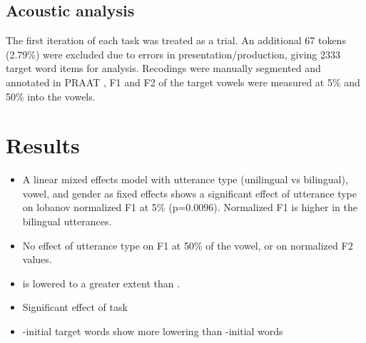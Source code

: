 \documentclass[11pt]{article}
\newcommand{\nt}[1]{\textipa{[#1]}} %
\newcommand{\wt}[1]{\textipa{/#1/}} %
\begin{document}
\subsection{Acoustic analysis}
The first iteration of each task was treated as a trial. An additional 67 tokens (2.79\%) were excluded due to errors in presentation/production, giving 2333 target word items for analysis. Recodings were manually segmented and annotated in PRAAT \cite{boersma2016praat}, F1 and F2 of the target vowels \nt{2, ae} were measured at 5\% and 50\% into the vowels. 


\section{Results} %
\begin{itemize}
	\item A linear mixed effects model with utterance type (unilingual vs bilingual), vowel, and gender as fixed effects shows a significant effect of utterance type on lobanov normalized F1 at 5\% (p=0.0096). Normalized F1 is higher in the bilingual utterances.
	
	\item No effect of utterance type on F1 at 50\% of the vowel, or on normalized F2 values.
	
	\item \nt{2} is lowered to a greater extent than \nt{\ae}. 
	
	\item Significant effect of task 
	
	\item \wt{d}-initial target words show more lowering than \wt{b}-initial words %
	
\end{itemize}
\end{document}
